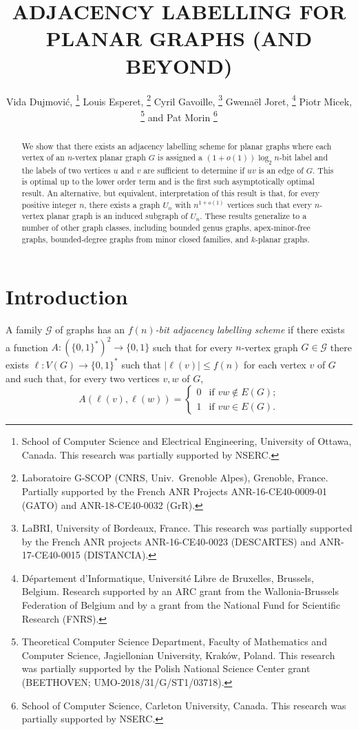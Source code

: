 \documentclass[kpfonts]{patmorin}
\title{\MakeUppercase{Adjacency Labelling for Planar Graphs (and Beyond)}}
\author{
  Vida Dujmović,%
    \thanks{School of Computer Science and Electrical Engineering, University of Ottawa, Canada. This research was partially supported by NSERC.}\quad
  Louis Esperet,%
    \thanks{Laboratoire G-SCOP (CNRS, Univ.\ Grenoble Alpes), Grenoble, France. Partially supported by the French ANR Projects ANR-16-CE40-0009-01 (GATO) and ANR-18-CE40-0032 (GrR).}\quad
  Cyril Gavoille,%
    \thanks{LaBRI, University of Bordeaux, France. This research was partially supported by the French ANR projects ANR-16-CE40-0023 (DESCARTES) and ANR-17-CE40-0015 (DISTANCIA).}\quad
  Gwenaël Joret,%
     \thanks{Département d'Informatique, Université Libre de Bruxelles, Brussels, Belgium. Research supported by an ARC grant from the Wallonia-Brussels Federation of Belgium and by a grant from the National Fund for Scientific Research (FNRS).}\quad
  Piotr Micek,%
    \thanks{Theoretical Computer Science Department, Faculty of Mathematics and Computer Science, Jagiellonian University, Krak\'{o}w, Poland. This research was partially supported by the Polish National Science Center grant (BEETHOVEN; UMO-2018/31/G/ST1/03718).}\newline
  and Pat Morin%
    \thanks{School of Computer Science, Carleton University, Canada. This research was partially supported by NSERC.}
}
\date{}
\let\le\leqslant
\begin{document}
\begin{titlepage}
\maketitle

\begin{abstract}
  We show that there exists an adjacency labelling scheme for planar graphs where each vertex of an $n$-vertex planar graph $G$ is assigned a $(1+o(1))\log_2 n$-bit label and the labels of two vertices $u$ and $v$ are sufficient to determine if $uv$ is an edge of $G$.  This is optimal up to the lower order term and is the first such asymptotically optimal result.  An alternative, but equivalent, interpretation of this result is that, for every positive integer $n$, there exists a graph $U_n$ with $n^{1+o(1)}$ vertices such that every $n$-vertex planar graph is an induced subgraph of $U_n$.  These results generalize to a number of other graph classes, including bounded genus graphs, apex-minor-free graphs,  bounded-degree graphs from minor closed families, and $k$-planar graphs.
\end{abstract}
\end{titlepage}
\tableofcontents

\newpage

\setcounter{page}{0}
\section{Introduction}


A family $\mathcal{G}$ of graphs has an \emph{$f(n)$-bit adjacency labelling scheme} if there exists a function $A:(\{0,1\}^*)^2\to \{0,1\}$ such that for every $n$-vertex graph $G\in \mathcal{G}$ there exists $\ell:V(G)\to\{0,1\}^*$ such that $|\ell(v)|\le f(n)$ for each vertex $v$ of $G$ and such that, for every two vertices $v,w$ of $G$,
\[  A(\ell(v),\ell(w)) =
      \begin{cases}
        0 & \text{if $vw\not\in E(G)$;} \\
        1 & \text{if $vw\in E(G)$.}
      \end{cases}
\]
\end{document}
